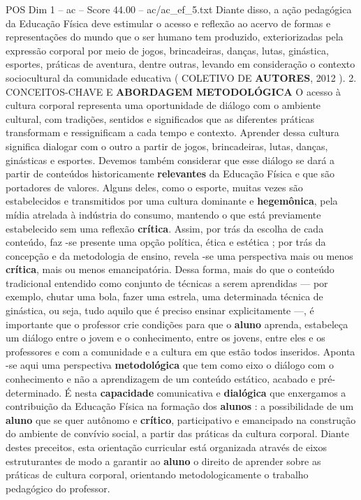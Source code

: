 \begin{textsample}{POS Dim 1 – ac – Score 44.00 – ac/ac\_ef\_5.txt}
Diante disso, a ação pedagógica da Educação Física deve estimular o acesso e reflexão ao acervo de formas e representações do mundo que o ser humano tem produzido, exteriorizadas pela expressão corporal por meio de jogos, brincadeiras, danças, lutas, ginástica, esportes, práticas de aventura, dentre outras, levando em consideração o contexto sociocultural da comunidade educativa ( COLETIVO DE \textbf{AUTORES}, 2012 ). 2.
CONCEITOS-CHAVE E \textbf{ABORDAGEM} \textbf{METODOLÓGICA} O acesso à cultura corporal representa uma oportunidade de diálogo com o ambiente cultural, com tradições, sentidos e significados que as diferentes práticas transformam e ressignificam a cada tempo e contexto.
Aprender dessa cultura significa dialogar com o outro a partir de jogos, brincadeiras, lutas, danças, ginásticas e esportes.
Devemos também considerar que esse diálogo se dará a partir de conteúdos historicamente \textbf{relevantes} da Educação Física e que são portadores de valores.
Alguns deles, como o esporte, muitas vezes são estabelecidos e transmitidos por uma cultura dominante e \textbf{hegemônica}, pela mídia atrelada à indústria do consumo, mantendo o que está previamente estabelecido sem uma reflexão \textbf{crítica}.
Assim, por trás da escolha de cada conteúdo, faz -se presente uma opção política, ética e estética ; por trás da concepção e da metodologia de ensino, revela -se uma perspectiva mais ou menos \textbf{crítica}, mais ou menos emancipatória.
Dessa forma, mais do que o conteúdo tradicional entendido como conjunto de técnicas a serem aprendidas — por exemplo, chutar uma bola, fazer uma estrela, uma determinada técnica de ginástica, ou seja, tudo aquilo que é preciso ensinar explicitamente —, é importante que o professor crie condições para que o \textbf{aluno} aprenda, estabeleça um diálogo entre o jovem e o conhecimento, entre os jovens, entre eles e os professores e com a comunidade e a cultura em que estão todos inseridos.
Aponta -se aqui uma perspectiva \textbf{metodológica} que tem como eixo o diálogo com o conhecimento e não a aprendizagem de um conteúdo estático, acabado e pré-determinado.
É nesta \textbf{capacidade} comunicativa e \textbf{dialógica} que enxergamos a contribuição da Educação Física na formação dos \textbf{alunos} : a possibilidade de um \textbf{aluno} que se quer autônomo e \textbf{crítico}, participativo e emancipado na construção do ambiente de convívio social, a partir das práticas da cultura corporal.
Diante destes preceitos, esta orientação curricular está organizada através de eixos estruturantes de modo a garantir ao \textbf{aluno} o direito de aprender sobre as práticas de cultura corporal, orientando metodologicamente o trabalho pedagógico do professor.

\end{textsample}
